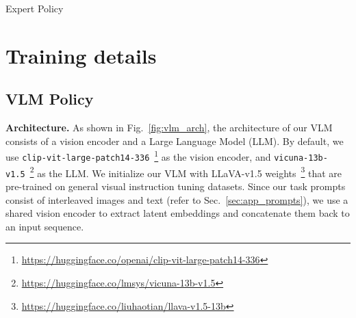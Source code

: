 \begin{algorithm}
    \caption{Expert Policy}
    \label{alg:expert}
    \begin{algorithmic}[1]

            \ELSE
            \ENDIF
        \ELSE
        \ENDIF
    \ELSE
        \ELSE
        \ENDIF
    \ENDIF
    \end{algorithmic}
    \end{algorithm}

\section{Training details}\label{sec:app_training_details}
\subsection{VLM Policy}
\label{subsec:vlm_policy}

\noindent \textbf{Architecture.} As shown in Fig.~\ref{fig:vlm_arch}, the architecture of our VLM consists of a vision encoder and a Large Language Model (LLM). By default, we use \texttt{clip-vit-large-patch14-336}~\footnote{\url{https://huggingface.co/openai/clip-vit-large-patch14-336}} as the vision encoder, and \texttt{vicuna-13b-v1.5}~\footnote{\url{https://huggingface.co/lmsys/vicuna-13b-v1.5}} as the LLM. We initialize our VLM with LLaVA-v1.5 weights~\footnote{\url{https://huggingface.co/liuhaotian/llava-v1.5-13b}} that are pre-trained on general visual instruction tuning datasets. Since our task prompts consist of interleaved images and text (refer to Sec.~\ref{sec:app_prompts}), we use a shared vision encoder to extract latent embeddings and concatenate them back to an input sequence. 



